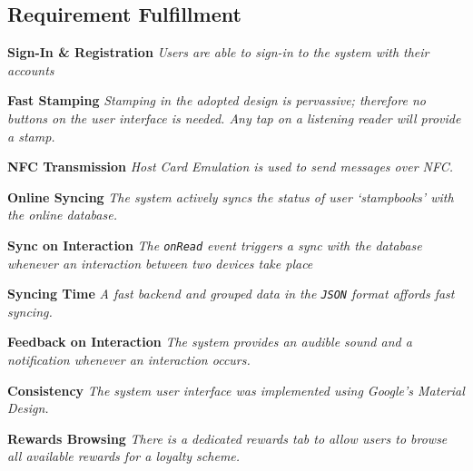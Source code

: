 \subsection{Requirement Fulfillment}
\begin{description}[leftmargin=!,labelwidth=\widthof{\bfseries Medium}]
    \item[M1] \textbf{Sign-In \& Registration} \newline
        \textit{Users are able to sign-in to the system with their accounts}
        
    \item[M2] \textbf{Fast Stamping} \newline
        \textit{Stamping in the adopted design is pervassive; therefore no buttons on the user interface is needed. Any tap on a listening reader will provide a stamp.}
    
    \item[M3] \textbf{NFC Transmission} \newline
        \textit{Host Card Emulation is used to send messages over NFC.}
        
    \item[M4] \textbf{Online Syncing} \newline
        \textit{The system actively syncs the status of user `stampbooks' with the online database.}
        
    \item[M5] \textbf{Sync on Interaction} \newline
        \textit{The \texttt{onRead} event triggers a sync with the database whenever an interaction between two devices take place}
        
    \item[M6] \textbf{Syncing Time} \newline
        \textit{A fast backend and grouped data in the \texttt{JSON} format affords fast syncing.}
        
    \item[M7] \textbf{Feedback on Interaction}
        \textit{The system provides an audible sound and a notification whenever an interaction occurs.}

    \item[S1] \textbf{Consistency} \newline
        \textit{The system user interface was implemented using Google's Material Design.}
        
    \item[S2] \textbf{Rewards Browsing} \newline
        \textit{There is a dedicated rewards tab to allow users to browse all available rewards for a loyalty scheme.}


\end{description}
